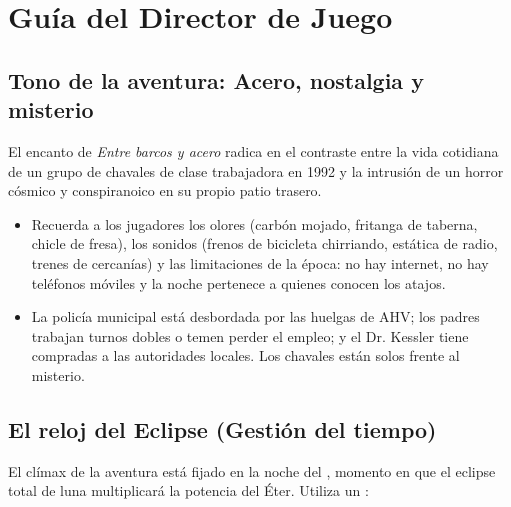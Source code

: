 \chapter{Guía del Director de Juego}

\section{Tono de la aventura: Acero, nostalgia y misterio}

El encanto de \emph{Entre barcos y acero} radica en el contraste entre la vida cotidiana de un grupo de chavales de clase trabajadora en 1992 y la intrusión de un horror cósmico y conspiranoico en su propio patio trasero. 

\begin{itemize}
  \item {} Recuerda a los jugadores los olores (carbón mojado, fritanga de taberna, chicle de fresa), los sonidos (frenos de bicicleta chirriando, estática de radio, trenes de cercanías) y las limitaciones de la época: no hay internet, no hay teléfonos móviles y la noche pertenece a quienes conocen los atajos.
  \item {} La policía municipal está desbordada por las huelgas de AHV; los padres trabajan turnos dobles o temen perder el empleo; y el Dr. Kessler tiene compradas a las autoridades locales. Los chavales están solos frente al misterio.
\end{itemize}

\section{El reloj del Eclipse (Gestión del tiempo)}

El clímax de la aventura está fijado en la noche del , momento en que el eclipse total de luna multiplicará la potencia del Éter. Utiliza un :

